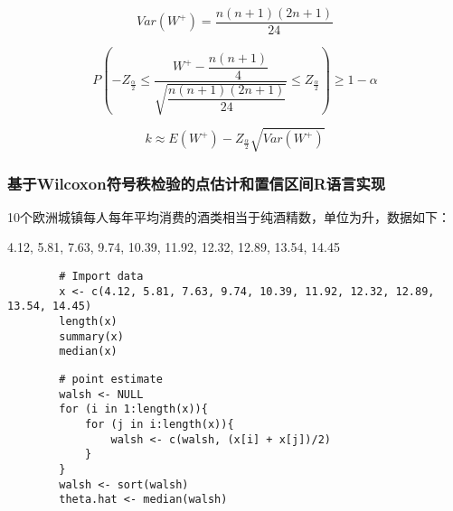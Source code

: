 \documentclass[UTF8]{ctexart}
\numberwithin{equation}{section}
\begin{document}
\begin{enumerate}
    \begin{equation}
        Var(W^+) = \dfrac{n(n+1)(2n+1)}{24}
        \nonumber
    \end{equation}

    \begin{equation}
        P(-Z_{\frac{\alpha}{2}} \leq \dfrac{W^+ - \dfrac{n(n+1)}{4}}{\sqrt{\dfrac{n(n+1)(2n+1)}{24}}} \leq Z_{\frac{\alpha}{2}}) \geq 1 - \alpha
       \nonumber
    \end{equation}

    \begin{equation}
        k \approx E(W^+) - Z_{\frac{\alpha}{2}} \sqrt{Var(W^+)}
        \nonumber
    \end{equation}
\end{enumerate}

\subsubsection{基于Wilcoxon符号秩检验的点估计和置信区间R语言实现}


10个欧洲城镇每人每年平均消费的酒类相当于纯酒精数，单位为升，数据如下：
\begin{center}
    4.12, 5.81, 7.63, 9.74, 10.39, 11.92, 12.32, 12.89, 13.54, 14.45
\end{center}

\begin{center}
    \begin{lstlisting}
        # Import data
        x <- c(4.12, 5.81, 7.63, 9.74, 10.39, 11.92, 12.32, 12.89, 13.54, 14.45)
        length(x)
        summary(x)
        median(x)
    \end{lstlisting}
\end{center}

\begin{center}
    \begin{lstlisting}
        # point estimate
        walsh <- NULL
        for (i in 1:length(x)){
            for (j in i:length(x)){
                walsh <- c(walsh, (x[i] + x[j])/2)
            }
        }
        walsh <- sort(walsh)
        theta.hat <- median(walsh)
    \end{lstlisting}
\end{center}
\end{document}
